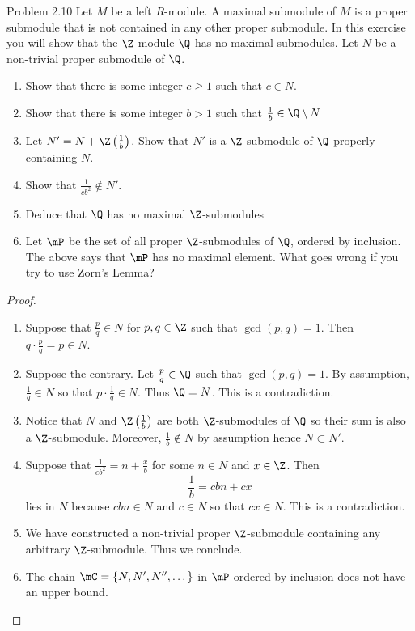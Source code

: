 \documentclass[a4paper]{article}
\begin{document}
\begin{ex}{Problem 2.10}{} Let $M$ be a left $R$-module. A maximal submodule of $M$ is a proper submodule that is not contained in any other proper submodule. In this exercise you will show that the $\Z$-module $\Q$ has no maximal submodules. Let $N$ be a non-trivial proper submodule of $\Q$. 
\begin{enumerate}
\item Show that there is some integer $c\geq 1$ such that $c\in N$.
\item Show that there is some integer $b>1$ such that $\frac{1}{b}\in\Q\setminus N$
\item Let $N'=N+\Z\left(\frac{1}{b}\right)$. Show that $N'$ is a $\Z$-submodule of $\Q$ properly containing $N$. 
\item Show that $\frac{1}{cb^2}\notin N'$. 
\item Deduce that $\Q$ has no maximal $\Z$-submodules
\item Let $\mP$ be the set of all proper $\Z$-submodules of $\Q$, ordered by inclusion. The above says that $\mP$ has no maximal element. What goes wrong if you try to use Zorn's Lemma?
\end{enumerate} 
\begin{proof}~\\
\begin{enumerate}
\item Suppose that $\frac{p}{q}\in N$ for $p,q\in\Z$ such that $\gcd(p,q)=1$. Then $q\cdot\frac{p}{q}=p\in N$. 
\item Suppose the contrary. Let $\frac{p}{q}\in\Q$ such that $\gcd(p,q)=1$. By assumption, $\frac{1}{q}\in N$ so that $p\cdot\frac{1}{q}\in N$. Thus $\Q=N$. This is a contradiction. 
\item Notice that $N$ and $\Z\left(\frac{1}{b}\right)$ are both $\Z$-submodules of $\Q$ so their sum is also a $\Z$-submodule. Moreover, $\frac{1}{b}\notin N$ by assumption hence $N\subset N'$. 
\item Suppose that $\frac{1}{cb^2}=n+\frac{x}{b}$ for some $n\in N$ and $x\in\Z$. Then $$\frac{1}{b}=cbn+cx$$ lies in $N$ because $cbn\in N$ and $c\in N$ so that $cx\in N$. This is a contradiction. 
\item We have constructed a non-trivial proper $\Z$-submodule containing any arbitrary $\Z$-submodule. Thus we conclude. 
\item The chain $\mC=\{N,N',N'',\dots\}$ in $\mP$ ordered by inclusion does not have an upper bound. 
\end{enumerate}
\end{proof}
\end{ex}
\end{document}
